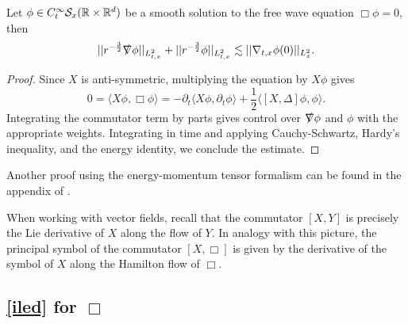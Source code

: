\begin{theorem}
	Let $\phi \in C^\infty_t \mathcal S_x (\mathbb R \times \mathbb R^d)$ be a smooth solution to the free wave equation $\Box \phi = 0$, then 
		\[
			|| r^{-\frac32}  \slashed \nabla \phi ||_{L^2_{t, x}} + ||r^{-\frac32}\phi ||_{L^2_{t, x}}\lesssim ||\nabla_{t, x} \phi (0)||_{L^2_x}. 
		\]
\end{theorem}

\begin{proof}
	Since $X$ is anti-symmetric, multiplying the equation by $X\phi$ gives
		\[
			0 = \langle X \phi, \Box \phi \rangle = -\partial_t \langle X \phi, \partial_t \phi \rangle + \frac12 \langle [X, \Delta] \phi, \phi \rangle.
		\]
	Integrating the commutator term by parts gives control over $\slashed \nabla \phi$ and $\phi$ with the appropriate weights. Integrating in time and applying Cauchy-Schwartz, Hardy's inequality, and the energy identity, we conclude the estimate. 
\end{proof}

\begin{remark}
	Another proof using the energy-momentum tensor formalism can be found in the appendix of \cite{SterbenzRodnianski2005}.
\end{remark}

\begin{remark}
	When working with vector fields, recall that the commutator $[X, Y]$ is precisely the Lie derivative of $X$ along the flow of $Y$. In analogy with this picture, the principal symbol of the commutator $[X, \Box]$ is given by the derivative of the symbol of $X$ along the Hamilton flow of $\Box$. 
\end{remark}	



\subsection{\eqref{iled} for $\Box$}

